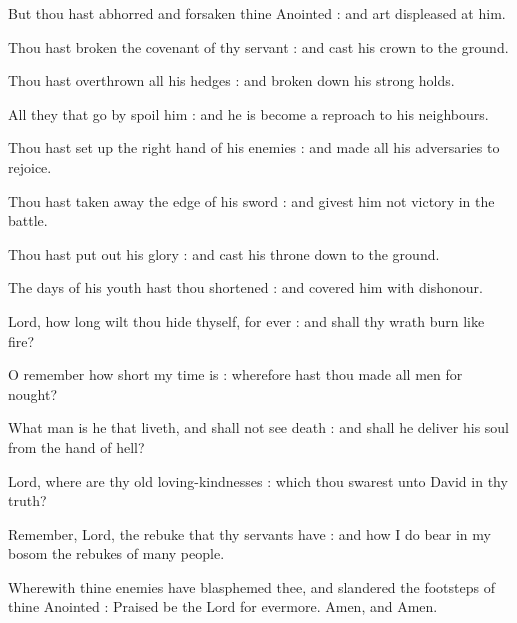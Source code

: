 But thou hast abhorred and forsaken thine Anointed : and art displeased at him.\par
{}Thou hast broken the covenant of thy servant : and cast his crown to the ground.\par
{}Thou hast overthrown all his hedges : and broken down his strong holds.\par
{}All they that go by spoil him : and he is become a reproach to his neighbours.\par
{}Thou hast set up the right hand of his enemies : and made all his adversaries to rejoice.\par
{}Thou hast taken away the edge of his sword : and givest him not victory in the battle.\par
{}Thou hast put out his glory : and cast his throne down to the ground.\par
{}The days of his youth hast thou shortened : and covered him with dishonour.\par
{}Lord, how long wilt thou hide thyself, for ever : and shall thy wrath burn like fire?\par
{}O remember how short my time is : wherefore hast thou made all men for nought?\par
{}What man is he that liveth, and shall not see death : and shall he deliver his soul from the hand of hell?\par
{}Lord, where are thy old loving-kindnesses : which thou swarest unto David in thy truth?\par
{}Remember, Lord, the rebuke that thy servants have : and how I do bear in my bosom the rebukes of many people.\par
{}Wherewith thine enemies have blasphemed thee, and slandered the footsteps of thine Anointed : Praised be the Lord for evermore. Amen, and Amen.\par




